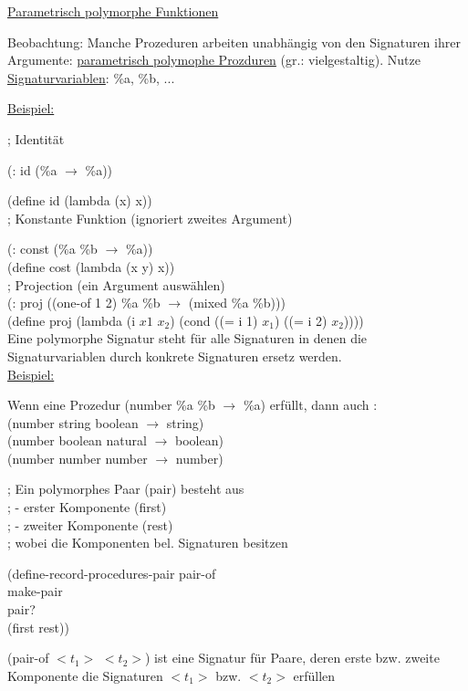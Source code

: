 \documentclass[a4paper, 20pt, openany]{book}
\begin{document}
\underline{Parametrisch polymorphe Funktionen}

Beobachtung: Manche Prozeduren arbeiten unabhängig von den Signaturen ihrer Argumente: \underline{parametrisch polymophe Prozduren} (gr.: vielgestaltig). Nutze \underline{Signaturvariablen}: \%a, \%b, ...

\underline{Beispiel:}

; Identität

(: id (\%a $\rightarrow$ \%a))

(define id (lambda (x) x)) \\

; Konstante Funktion (ignoriert zweites Argument)

(: const (\%a \%b $\rightarrow$ \%a)) \\
(define cost (lambda (x y) x)) \\

; Projection (ein Argument auswählen) \\
(: proj ((one-of 1 2) \%a \%b $\rightarrow$ (mixed \%a \%b))) \\
(define proj (lambda (i $x1$ $x_2$) (cond ((= i 1) $x_1$) ((= i 2) $x_2$)))) \\

Eine polymorphe Signatur steht für alle Signaturen in denen die Signaturvariablen durch konkrete Signaturen ersetz werden. \\

\underline{Beispiel:}

Wenn eine Prozedur (number \%a \%b $\rightarrow$ \%a) erfüllt, dann auch : \\
(number string boolean $\rightarrow$ string) \\
(number boolean natural $\rightarrow$ boolean) \\
(number number number $\rightarrow$ number)

; Ein polymorphes Paar (pair) besteht aus \\
; - erster Komponente (first) \\
; - zweiter Komponente (rest) \\
; wobei die Komponenten bel. Signaturen besitzen \\
\begin{center}
(define-record-procedures-pair pair-of \\
make-pair \\
pair? \\
(first rest))
\end{center} 

(pair-of $<t_1>$ $<t_2>$) ist eine Signatur für Paare, deren erste bzw. zweite Komponente die Signaturen $<t_1>$ bzw. $<t_2>$ erfüllen \\
\end{document}
